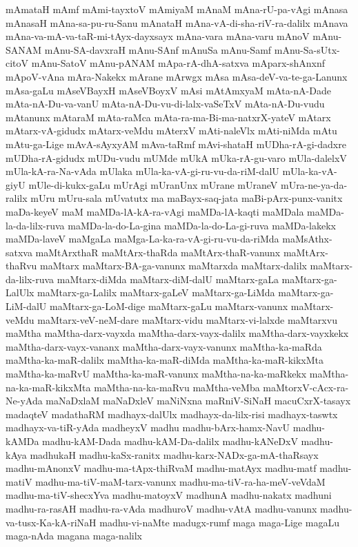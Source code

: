 {mAmataH
mAmf
mAmi-tayxtoV
mAmiyaM
mAnaM
mAna-rU-pa-vAgi
mAnasa
mAnasaH
mAna-sa-pu-ru-Sanu
mAnataH
mAna-vA-di-sha-riV-ra-dalilx
mAnava
mAna-va-mA-va-taR-mi-tAyx-dayxsayx
mAna-vara
mAna-varu
mAnoV
mAnu-SANAM
mAnu-SA-davxraH
mAnu-SAnf
mAnuSa
mAnu-Samf
mAnu-Sa-sUtx-citoV
mAnu-SatoV
mAnu-pANAM
mApa-rA-dhA-satxva
mAparx-shAnxnf
mApoV-vAna
mAra-Nakekx
mArane
mArwgx
mAsa
mAsa-deV-va-te-ga-Lanunx
mAsa-gaLu
mAseVBayxH
mAseVBoyxV
mAsi
mAtAmxyaM
mAta-nA-Dade
mAta-nA-Du-va-vanU
mAta-nA-Du-vu-di-lalx-vaSeTxV
mAta-nA-Du-vudu
mAtanunx
mAtaraM
mAta-raMca
mAta-ra-ma-Bi-ma-natxrX-yateV
mAtarx
mAtarx-vA-gidudx
mAtarx-veMdu
mAterxV
mAti-naleVlx
mAti-niMda
mAtu
mAtu-ga-Lige
mAvA-sAyxyAM
mAva-taRmf
mAvi-shataH
mUDha-rA-gi-dadxre
mUDha-rA-gidudx
mUDu-vudu
mUMde
mUkA
mUka-rA-gu-varo
mUla-dalelxV
mUla-kA-ra-Na-vAda
mUlaka
mUla-ka-vA-gi-ru-vu-da-riM-dalU
mUla-ka-vA-giyU
mUle-di-kukx-gaLu
mUrAgi
mUranUnx
mUrane
mUraneV
mUra-ne-ya-da-ralilx
mUru
mUru-sala
mUvatutx
ma
maBayx-saq-jata
maBi-pArx-punx-vanitx
maDa-keyeV
maM
maMDa-lA-kA-ra-vAgi
maMDa-lA-kaqti
maMDala
maMDa-la-da-lilx-ruva
maMDa-la-do-La-gina
maMDa-la-do-La-gi-ruva
maMDa-lakekx
maMDa-laveV
maMgaLa
maMga-La-ka-ra-vA-gi-ru-vu-da-riMda
maMsAthx-satxva
maMtArxthaR
maMtArx-thaRda
maMtArx-thaR-vanunx
maMtArx-thaRvu
maMtarx
maMtarx-BA-ga-vanunx
maMtarxda
maMtarx-dalilx
maMtarx-da-lilx-ruva
maMtarx-diMda
maMtarx-diM-dalU
maMtarx-gaLa
maMtarx-ga-LalUlx
maMtarx-ga-Lalilx
maMtarx-gaLeV
maMtarx-ga-LiMda
maMtarx-ga-LiM-dalU
maMtarx-ga-LoM-dige
maMtarx-gaLu
maMtarx-vanunx
maMtarx-veMdu
maMtarx-veV-neM-dare
maMtarx-vidu
maMtarx-vi-lalxde
maMtarxvu
maMtha
maMtha-darx-vayxda
maMtha-darx-vayx-dalilx
maMtha-darx-vayxkekx
maMtha-darx-vayx-vananx
maMtha-darx-vayx-vanunx
maMtha-ka-maRda
maMtha-ka-maR-dalilx
maMtha-ka-maR-diMda
maMtha-ka-maR-kikxMta
maMtha-ka-maRvU
maMtha-ka-maR-vanunx
maMtha-na-ka-maRkekx
maMtha-na-ka-maR-kikxMta
maMtha-na-ka-maRvu
maMtha-veMba
maMtorxV-cAcx-ra-Ne-yAda
maNaDxlaM
maNaDxleV
maNiNxna
maRniV-SiNaH
macuCxrX-tasayx
madaqteV
madathaRM
madhayx-dalUlx
madhayx-da-lilx-risi
madhayx-taswtx
madhayx-va-tiR-yAda
madheyxV
madhu
madhu-bArx-hamx-NavU
madhu-kAMDa
madhu-kAM-Dada
madhu-kAM-Da-dalilx
madhu-kANeDxV
madhu-kAya
madhukaH
madhu-kaSx-ranitx
madhu-karx-NADx-ga-mA-thaRsayx
madhu-mAnonxV
madhu-ma-tApx-thiRvaM
madhu-matAyx
madhu-matf
madhu-matiV
madhu-ma-tiV-maM-tarx-vanunx
madhu-ma-tiV-ra-ha-meV-veVdaM
madhu-ma-tiV-shecxYva
madhu-matoyxV
madhunA
madhu-nakatx
madhuni
madhu-ra-rasAH
madhu-ra-vAda
madhuroV
madhu-vAtA
madhu-vanunx
madhu-va-tusx-Ka-kA-riNaH
madhu-vi-naMte
madugx-rumf
maga
maga-Lige
magaLu
maga-nAda
magana
maga-nalilx
}
